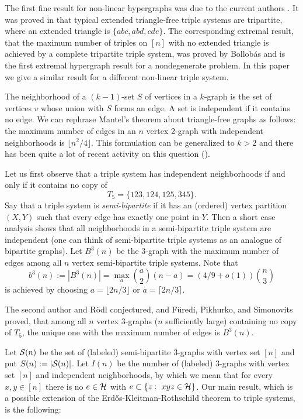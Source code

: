 \documentclass[11pt]{article}
\begin{document}
The first fine result for non-linear hypergraphs was due to the
current authors \cite{t5}. It was proved in \cite{t5} that typical  extended triangle-free
triple systems are tripartite, where an extended triangle is
$\{abc,abd,cde\}$.  The corresponding extremal result, that the maximum number of triples on $[n]$ with no extended
triangle is achieved by a complete tripartite triple system, was proved by Bollob\'as \cite{bollobas:74} and is  the first extremal hypergraph result for a nondegenerate problem.
  In this paper we give a similar result for a different non-linear triple system.


The neighborhood of a $(k-1)$-set $S$ of vertices in a $k$-graph is the set of vertices
$v$ whose union with $S$ forms an edge. A set is independent if it contains no edge.
We can rephrase Mantel's theorem about triangle-free graphs as follows: the maximum number of
 edges in an $n$ vertex  2-graph with independent neighborhoods is $\lfloor n^2/4 \rfloor$.
 This formulation can be generalized to $k>2$ and there has been quite a lot of recent
 activity on this question (\cite{MR, FPS, FMP, BFMP}).

 Let us first observe that a triple system has independent neighborhoods if and only if it contains no copy of
$$T_5=\{123, 124, 125, 345\}.$$  Say that a triple system is {\em semi-bipartite} if it has an (ordered)
 vertex partition $(X,Y)$ such that every edge has exactly one point in $Y$. Then a short case analysis shows that
  all neighborhoods in a semi-bipartite triple system are independent (one can think of semi-bipartite triple systems
   as an analogue of bipartite graphs). Let $B^3(n)$ be the $3$-graph with
the maximum number of edges among all $n$ vertex semi-bipartite
triple systems. Note that
$$b^3(n):=|B^3(n)|=\max_a {a \choose 2}(n-a)=(4/9+o(1)){n \choose 3}$$
is achieved by choosing $a=\lfloor 2n/3 \rfloor$ or $a=\lceil 2n/3
\rceil$.

The second author and R\"odl \cite{MR} conjectured, and F\"uredi,
Pikhurko, and Simonovits \cite{FPS} proved, that among all $n$
vertex $3$-graphs ($n$ sufficiently large) containing no
 copy of  $T_5$, the unique one with the maximum number of edges is $B^3(n)$.


Let  $\mathcal{S}(n)$ be the set of (labeled)  semi-bipartite $3$-graphs
with vertex set  $[n]$ and put $S(n):=|\mathcal{S}(n)|$. Let $I(n)$ be the
number of (labeled) $3$-graphs with vertex set $[n]$ and independent
neighborhoods, by which we mean that for every $x,y\in [n]$ there is
no $e \in \mathcal{H}$ with $e \subset \{z:\ xyz\in \mathcal{H}\}$.
 Our main result, which is a possible extension of the Erd\H os-Kleitman-Rothschild
 theorem to triple systems, is the following:
\end{document}
